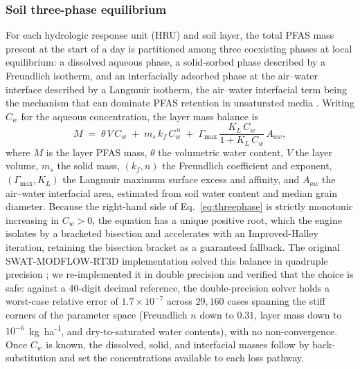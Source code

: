 \subsubsection{Soil three-phase equilibrium}
For each hydrologic response unit (HRU) and soil layer, the total PFAS mass present at the start of a day is partitioned among three coexisting phases at local equilibrium: a dissolved aqueous phase, a solid-sorbed phase described by a Freundlich isotherm, and an interfacially adsorbed phase at the air--water interface described by a Langmuir isotherm, the air--water interfacial term being the mechanism that can dominate PFAS retention in unsaturated media \citep{brusseau2018,guo2020,rafiei2023pfas}. Writing $C_w$ for the aqueous concentration, the layer mass balance is
\begin{equation}
M \;=\; \theta\,V\,C_w \;+\; m_s\,k_f\,C_w^{\,n} \;+\; \Gamma_{\max}\,\frac{K_L\,C_w}{1+K_L\,C_w}\,A_{aw},
\label{eq:threephase}
\end{equation}
where $M$ is the layer PFAS mass, $\theta$ the volumetric water content, $V$ the layer volume, $m_s$ the solid mass, $(k_f,n)$ the Freundlich coefficient and exponent, $(\Gamma_{\max},K_L)$ the Langmuir maximum surface excess and affinity, and $A_{aw}$ the air--water interfacial area, estimated from soil water content and median grain diameter. Because the right-hand side of Eq.~\eqref{eq:threephase} is strictly monotonic increasing in $C_w>0$, the equation has a unique positive root, which the engine isolates by a bracketed bisection and accelerates with an Improved-Halley iteration, retaining the bisection bracket as a guaranteed fallback. The original SWAT-MODFLOW-RT3D implementation solved this balance in quadruple precision \citep{rafiei2023pfas}; we re-implemented it in double precision and verified that the choice is safe: against a 40-digit decimal reference, the double-precision solver holds a worst-case relative error of $1.7\times10^{-7}$ across $29{,}160$ cases spanning the stiff corners of the parameter space (Freundlich $n$ down to $0.31$, layer mass down to $10^{-6}$~kg~ha\textsuperscript{-1}, and dry-to-saturated water contents), with no non-convergence. Once $C_w$ is known, the dissolved, solid, and interfacial masses follow by back-substitution and set the concentrations available to each loss pathway.


